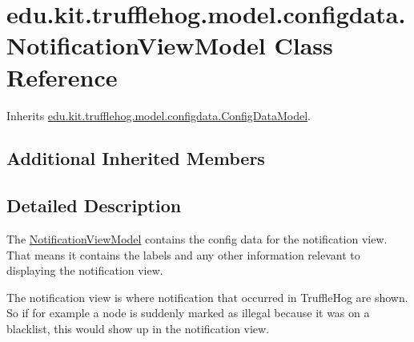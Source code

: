 \hypertarget{classedu_1_1kit_1_1trufflehog_1_1model_1_1configdata_1_1_notification_view_model}{}\section{edu.\+kit.\+trufflehog.\+model.\+configdata.\+Notification\+View\+Model Class Reference}
\label{classedu_1_1kit_1_1trufflehog_1_1model_1_1configdata_1_1_notification_view_model}


Inherits \hyperlink{classedu_1_1kit_1_1trufflehog_1_1model_1_1configdata_1_1_config_data_model}{edu.\+kit.\+trufflehog.\+model.\+configdata.\+Config\+Data\+Model}.

\subsection*{Additional Inherited Members}


\subsection{Detailed Description}
The \hyperlink{classedu_1_1kit_1_1trufflehog_1_1model_1_1configdata_1_1_notification_view_model}{Notification\+View\+Model} contains the config data for the notification view. That means it contains the labels and any other information relevant to displaying the notification view. 

The notification view is where notification that occurred in Truffle\+Hog are shown. So if for example a node is suddenly marked as illegal because it was on a blacklist, this would show up in the notification view. 